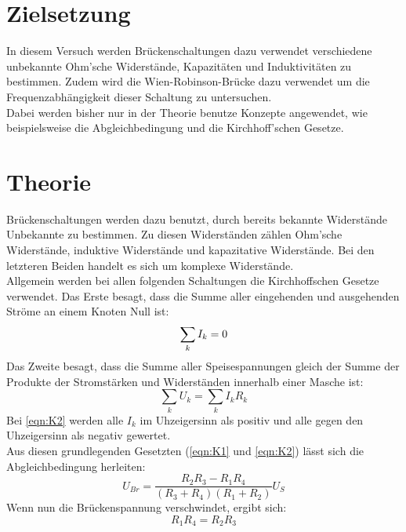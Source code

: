 \section{Zielsetzung}
\label{sec:Zielsetzung}
In diesem Versuch werden Brückenschaltungen dazu verwendet verschiedene unbekannte Ohm'sche Widerstände, Kapazitäten und Induktivitäten
zu bestimmen. Zudem wird die Wien-Robinson-Brücke dazu verwendet um die Frequenzabhängigkeit dieser Schaltung zu untersuchen. \\
Dabei werden bisher nur in der Theorie benutze Konzepte angewendet, wie beispielsweise die Abgleichbedingung und die Kirchhoff'schen Gesetze.

\section{Theorie}
\label{sec:Theorie}

Brückenschaltungen werden dazu benutzt, durch bereits bekannte Widerstände Unbekannte zu bestimmen. Zu diesen Widerständen zählen
Ohm'sche Widerstände, induktive Widerstände und kapazitative Widerstände. Bei den letzteren Beiden handelt es sich um komplexe
Widerstände. \\
Allgemein werden bei allen folgenden Schaltungen die Kirchhoffschen Gesetze verwendet. Das Erste besagt, dass die Summe aller eingehenden
und ausgehenden Ströme an einem Knoten Null ist:
\begin{equation}
    \sum_k I_k = 0 \\ \label{eqn:K1}
\end{equation}
Das Zweite besagt, dass die Summe aller Speisespannungen gleich der Summe der Produkte der Stromstärken und Widerständen innerhalb einer Masche ist:
\begin{equation}
    \sum_k U_k = \sum_k I_k R_k \label{eqn:K2}
\end{equation}
Bei \autoref{eqn:K2} werden alle $I_k$ im Uhzeigersinn als positiv und alle gegen den Uhzeigersinn als negativ gewertet. \\
Aus diesen grundlegenden Gesetzten (\autoref{eqn:K1} und \autoref{eqn:K2}) lässt sich die Abgleichbedingung herleiten:
\begin{equation*}
    U_{Br} = \frac{R_2 R_3 - R_1 R_4}{(R_3 + R_4)(R_1 + R_2)} U_S
\end{equation*}
Wenn nun die Brückenspannung verschwindet, ergibt sich:
\begin{equation}
    R_1 R_4 = R_2 R_3 \label{eqn:Abgl}
\end{equation}
\\

